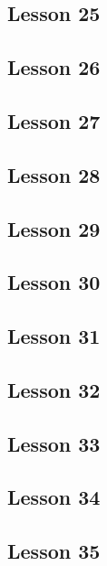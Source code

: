\subsection{Lesson 25}


\subsection{Lesson 26}


\subsection{Lesson 27}


\subsection{Lesson 28}


\subsection{Lesson 29}


\subsection{Lesson 30}


\subsection{Lesson 31}


\subsection{Lesson 32}


\subsection{Lesson 33}


\subsection{Lesson 34}


\subsection{Lesson 35}


